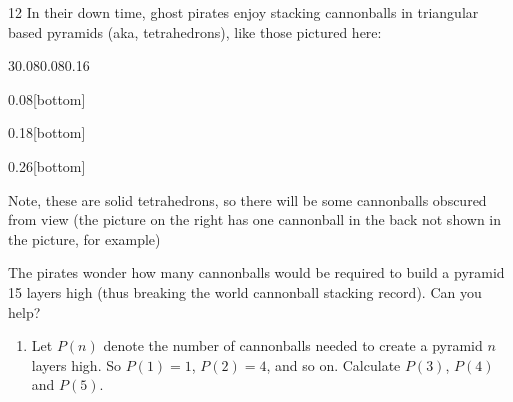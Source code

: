 \documentclass[11pt,]{book}
\theoremstyle{ptxplainnotitle}
\theoremstyle{ptxplaintitle}
\theoremstyle{ptxdefinitionnotitle}
\theoremstyle{ptxdefinitiontitle}
\theoremstyle{ptxdefinitionnotitle}
\theoremstyle{ptxdefinitiontitle}
\theoremstyle{ptxdefinitionnotitle}
\theoremstyle{ptxdefinitiontitle}
\theoremstyle{ptxdefinitiontitlenonumber}
\theoremstyle{ptxdefinitiontitlenonumber}
\numberwithin{equation}{chapter}
\begin{document}
\begin{divisionexercise}{12}\hypertarget{exercise-40}{}
\hypertarget{p-405}{}%
In their down time, ghost pirates enjoy stacking cannonballs in triangular based pyramids (aka, tetrahedrons), like those pictured here:%
\begin{sidebyside}{3}{0.08}{0.08}{0.16}
\begin{sbspanel}{0.08}[bottom]
\end{sbspanel}
\begin{sbspanel}{0.18}[bottom]
\end{sbspanel}
\begin{sbspanel}{0.26}[bottom]
\end{sbspanel}
\end{sidebyside}
\par
\hypertarget{p-406}{}%
Note, these are solid tetrahedrons, so there will be some cannonballs obscured from view (the picture on the right has one cannonball in the back not shown in the picture, for example)%
\par
\hypertarget{p-407}{}%
The pirates wonder how many cannonballs would be required to build a pyramid 15 layers high (thus breaking the world cannonball stacking record). Can you help? \leavevmode%
\begin{enumerate}[label=(\alph*)]
\item\hypertarget{li-210}{}\hypertarget{p-408}{}%
Let \(P(n)\) denote the number of cannonballs needed to create a pyramid \(n\) layers high. So \(P(1) = 1\), \(P(2) = 4\), and so on. Calculate \(P(3)\), \(P(4)\) and \(P(5)\). %

\end{enumerate}
\end{divisionexercise}
\end{document}

